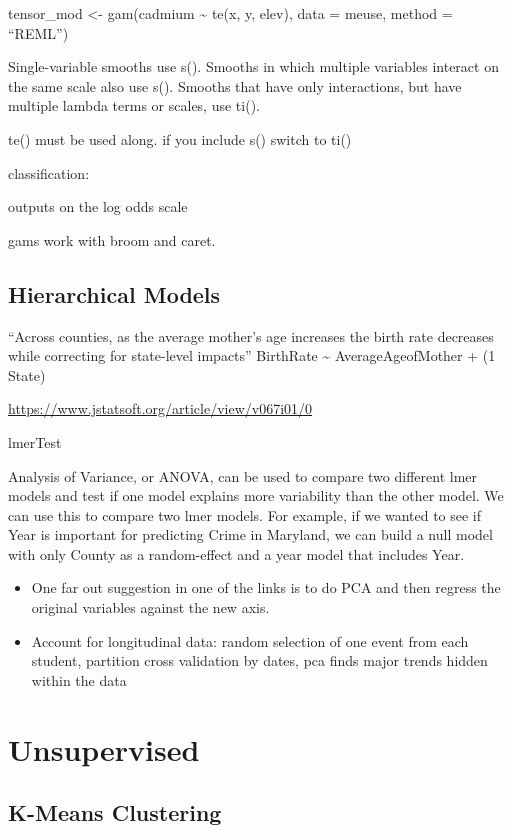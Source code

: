 \documentclass[]{book}
\begin{document}
tensor\_mod \textless{}- gam(cadmium \textasciitilde{} te(x, y, elev), data = meuse, method = ``REML'')

Single-variable smooths use s().
Smooths in which multiple variables interact on the same scale also use s().
Smooths that have only interactions, but have multiple lambda terms or scales, use ti().

te() must be used along. if you include s() switch to ti()

classification:

outputs on the log odds scale

gams work with broom and caret.

\hypertarget{hierarchical-models}{%
\subsection{Hierarchical Models}\label{hierarchical-models}}

``Across counties, as the average mother's age increases the birth rate decreases while correcting for state-level impacts'' BirthRate \textasciitilde{} AverageAgeofMother + (1 \textbar{} State)

\url{https://www.jstatsoft.org/article/view/v067i01/0}

lmerTest

Analysis of Variance, or ANOVA, can be used to compare two different lmer models and test if one model explains more variability than the other model. We can use this to compare two lmer models. For example, if we wanted to see if Year is important for predicting Crime in Maryland, we can build a null model with only County as a random-effect and a year model that includes Year.

\begin{itemize}
\item
  One far out suggestion in one of the links is to do PCA and then regress the original variables against the new axis.
\item
  Account for longitudinal data: random selection of one event from each student, partition cross validation by dates, pca finds major trends hidden within the data
\end{itemize}

\hypertarget{unsupervised}{%
\section{Unsupervised}\label{unsupervised}}

\hypertarget{k-means-clustering}{%
\subsection{K-Means Clustering}\label{k-means-clustering}}
\end{document}
